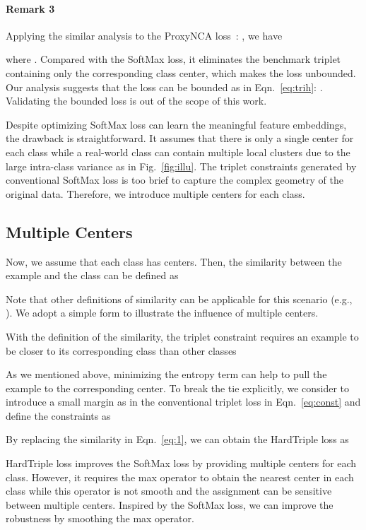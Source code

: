 \documentclass[10pt,twocolumn,letterpaper]{article}
\begin{document}
\paragraph{Remark 3} Applying the similar analysis to the ProxyNCA loss~\cite{Attias17}: , we have

where . Compared with the SoftMax loss, it eliminates the benchmark triplet containing only the corresponding class center, which makes the loss unbounded. Our analysis suggests that the loss can be bounded as in Eqn.~\ref{eq:trih}: 
. Validating the bounded loss is out of the scope of this work.

Despite optimizing SoftMax loss can learn the meaningful feature embeddings, the drawback is straightforward. It assumes that there is only a single center for each class while a real-world class can contain multiple local clusters due to the large intra-class variance as in Fig.~\ref{fig:illu}. The triplet constraints generated by conventional SoftMax loss is too brief to capture the complex geometry of the original data. Therefore, we introduce multiple centers for each class.

\subsection{Multiple Centers}
Now, we assume that each class has  centers. Then, the similarity between the example  and the class  can be defined as

Note that other definitions of similarity can be applicable for this scenario (e.g., ). We adopt a simple form to illustrate the influence of multiple centers.

With the definition of the similarity, the triplet constraint requires an example to be closer to its corresponding class than other classes

As we mentioned above, minimizing the entropy term  can help to pull the example to the corresponding center. To break the tie explicitly, we consider to introduce a small margin as in the conventional triplet loss in Eqn.~\ref{eq:const} and define the constraints as


By replacing the similarity in Eqn.~\ref{eq:1}, we can obtain the HardTriple loss as


HardTriple loss improves the SoftMax loss by providing multiple centers for each class. However, it requires the max operator to obtain the nearest center in each class while this operator is not smooth and the assignment can be sensitive between multiple centers. Inspired by the SoftMax loss, we can improve the robustness by smoothing the max operator.
\end{document}
